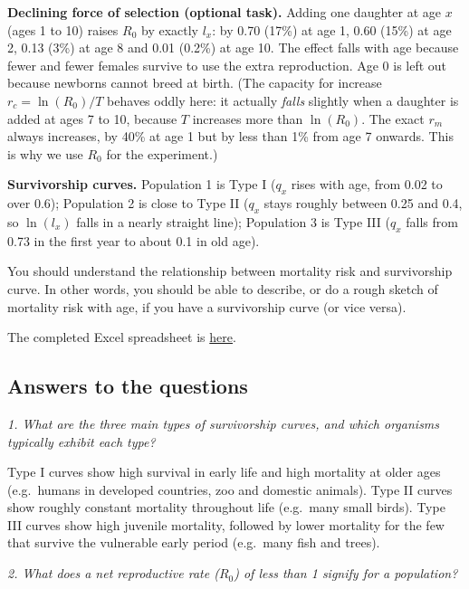 \documentclass[
  a4paper]{book}
\begin{document}
\textbf{Declining force of selection (optional task).} Adding one daughter at age \(x\) (ages 1 to 10) raises \(R_0\) by exactly \(l_x\): by 0.70 (17\%) at age 1, 0.60 (15\%) at age 2, 0.13 (3\%) at age 8 and 0.01 (0.2\%) at age 10. The effect falls with age because fewer and fewer females survive to use the extra reproduction. Age 0 is left out because newborns cannot breed at birth. (The capacity for increase \(r_c = \ln(R_0)/T\) behaves oddly here: it actually \emph{falls} slightly when a daughter is added at ages 7 to 10, because \(T\) increases more than \(\ln(R_0)\). The exact \(r_m\) always increases, by 40\% at age 1 but by less than 1\% from age 7 onwards. This is why we use \(R_0\) for the experiment.)

\textbf{Survivorship curves.} Population 1 is Type I (\(q_x\) rises with age, from 0.02 to over 0.6); Population 2 is close to Type II (\(q_x\) stays roughly between 0.25 and 0.4, so \(\ln(l_x)\) falls in a nearly straight line); Population 3 is Type III (\(q_x\) falls from 0.73 in the first year to about 0.1 in old age).

You should understand the relationship between mortality risk and survivorship curve. In other words, you should be able to describe, or do a rough sketch of mortality risk with age, if you have a survivorship curve (or vice versa).

The completed Excel spreadsheet is \href{https://www.dropbox.com/scl/fi/tsvfeezeiz7z6j7b9jrju/Life_Tables_Exercise_Complete.xlsx?rlkey=ius84aakppl11oqvdw5ksnlyp&dl=1}{here}.

\subsection{Answers to the questions}\label{answers-to-the-questions}

\emph{1. What are the three main types of survivorship curves, and which organisms typically exhibit each type?}

Type I curves show high survival in early life and high mortality at older ages (e.g.~humans in developed countries, zoo and domestic animals). Type II curves show roughly constant mortality throughout life (e.g.~many small birds). Type III curves show high juvenile mortality, followed by lower mortality for the few that survive the vulnerable early period (e.g.~many fish and trees).

\emph{2. What does a net reproductive rate (\(R_0\)) of less than 1 signify for a population?}
\end{document}
